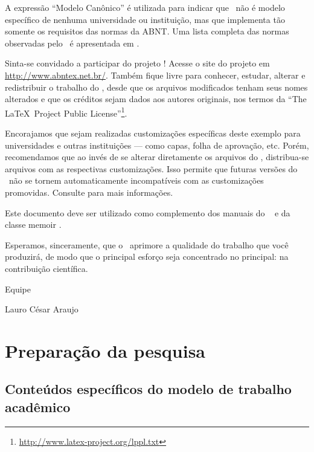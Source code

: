 \documentclass[
	12pt,				%
	openright,			%
	twoside,			%
	a4paper,			%
	english,			%
	french,				%
	spanish,			%
	brazil				%
	]{abntex2}
\begin{document}
A expressão ``Modelo Canônico'' é utilizada para indicar que \abnTeX\ não é
modelo específico de nenhuma universidade ou instituição, mas que implementa tão
somente os requisitos das normas da ABNT. Uma lista completa das normas
observadas pelo \abnTeX\ é apresentada em .

Sinta-se convidado a participar do projeto \abnTeX! Acesse o site do projeto em
\url{http://www.abntex.net.br/}. Também fique livre para conhecer,
estudar, alterar e redistribuir o trabalho do \abnTeX, desde que os arquivos
modificados tenham seus nomes alterados e que os créditos sejam dados aos
autores originais, nos termos da ``The \LaTeX\ Project Public
License''\footnote{\url{http://www.latex-project.org/lppl.txt}}.

Encorajamos que sejam realizadas customizações específicas deste exemplo para
universidades e outras instituições --- como capas, folha de aprovação, etc.
Porém, recomendamos que ao invés de se alterar diretamente os arquivos do
\abnTeX, distribua-se arquivos com as respectivas customizações.
Isso permite que futuras versões do \abnTeX~não se tornem automaticamente
incompatíveis com as customizações promovidas. Consulte
 para mais informações.

Este documento deve ser utilizado como complemento dos manuais do \abnTeX\ 
\cite{abntex2classe,abntex2cite,abntex2cite-alf} e da classe \textsf{memoir}
\cite{memoir}. 

Esperamos, sinceramente, que o \abnTeX\ aprimore a qualidade do trabalho que
você produzirá, de modo que o principal esforço seja concentrado no principal:
na contribuição científica.

Equipe \abnTeX 

Lauro César Araujo
\part{Preparação da pesquisa}



\chapter{Conteúdos específicos do modelo de trabalho acadêmico}\label{cap_trabalho_academico}
\end{document}
